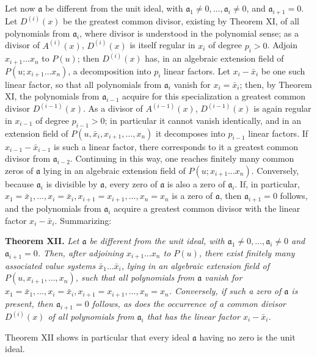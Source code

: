 \documentclass[11pt]{article}
\providecommand{\aideal}{\mathfrak a}
\begin{document}
Let now $\aideal$ be different from the unit ideal, with $\aideal_1\ne0,
\ldots,\aideal_i\ne0$, and $\aideal_{i+1}=0$. Let $D^{(i)}(x)$ be the greatest common divisor, existing by Theorem XI, of all polynomials from $\aideal_i$, where divisor is understood in the polynomial sense; as a divisor of $A^{(i)}(x)$, $D^{(i)}(x)$ is itself regular in $x_i$ of degree $p_i>0$. Adjoin $x_{i+1}\ldots x_n$ to $P(u)$; then $D^{(i)}(x)$ has, in an algebraic extension field of $P(u;x_{i+1}\ldots x_n)$, a decomposition into $p_i$ linear factors. Let $x_i-\bar x_i$ be one such linear factor, so that all polynomials from $\aideal_i$ vanish for $x_i=\bar x_i$; then, by Theorem XI, the polynomials from $\aideal_{i-1}$ acquire for this specialization a greatest common divisor $D^{(i-1)}(x)$. As a divisor of $A^{(i-1)}(x)$, $D^{(i-1)}(x)$ is again regular in $x_{i-1}$ of degree $p_{i-1}>0$; in particular it cannot vanish identically, and in an extension field of $P(u,
\bar x_i,x_{i+1},
\ldots,x_n)$ it decomposes into $p_{i-1}$ linear factors. If $x_{i-1}-\bar x_{i-1}$ is such a linear factor, there corresponds to it a greatest common divisor from $\aideal_{i-2}$. Continuing in this way, one reaches finitely many common zeros of $\aideal$ lying in an algebraic extension field of $P(u;x_{i+1}\ldots x_n)$. Conversely, because $\aideal_i$ is divisible by $\aideal$, every zero of $\aideal$ is also a zero of $\aideal_i$. If, in particular, $x_1=\bar x_1,
\ldots,x_i=\bar x_i,x_{i+1}=x_{i+1},
\ldots,x_n=x_n$ is a zero of $\aideal$, then $\aideal_{i+1}=0$ follows, and the polynomials from $\aideal_i$ acquire a greatest common divisor with the linear factor $x_i-\bar x_i$. Summarizing:

\medskip
\noindent\textbf{Theorem XII.} \emph{Let $\aideal$ be different from the unit ideal, with $\aideal_1\ne0,
\ldots,\aideal_i\ne0$ and $\aideal_{i+1}=0$. Then, after adjoining $x_{i+1}\ldots x_n$ to $P(u)$, there exist finitely many associated value systems $\bar x_1\ldots\bar x_i$, lying in an algebraic extension field of $P(u,x_{i+1},
\ldots,x_n)$, such that all polynomials from $\aideal$ vanish for $x_1=\bar x_1,
\ldots,x_i=\bar x_i,x_{i+1}=x_{i+1},
\ldots,x_n=x_n$. Conversely, if such a zero of $\aideal$ is present, then $\aideal_{i+1}=0$ follows, as does the occurrence of a common divisor $D^{(i)}(x)$ of all polynomials from $\aideal_i$ that has the linear factor $x_i-\bar x_i$.}

Theorem XII shows in particular that every ideal $\aideal$ having no zero is the unit ideal.
\end{document}
